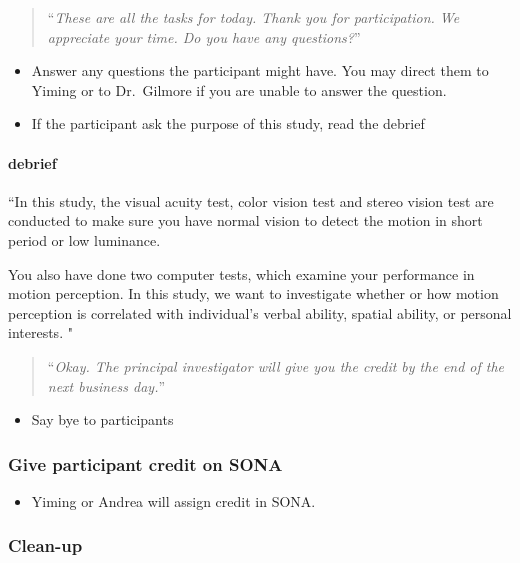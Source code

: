 \documentclass[]{article}
\providecommand{\tightlist}{%
  \setlength{\itemsep}{0pt}\setlength{\parskip}{0pt}}
\let\oldparagraph\paragraph
\renewcommand{\paragraph}[1]{\oldparagraph{#1}\mbox{}}
\begin{document}
\begin{quote}
``\emph{These are all the tasks for today. Thank you for participation.
We appreciate your time. Do you have any questions?}''
\end{quote}

\begin{itemize}
\tightlist
\item
  Answer any questions the participant might have. You may direct them
  to Yiming or to Dr.~Gilmore if you are unable to answer the question.
\item
  If the participant ask the purpose of this study, read the debrief
\end{itemize}

\paragraph{debrief}\label{debrief}

``In this study, the visual acuity test, color vision test and stereo
vision test are conducted to make sure you have normal vision to detect
the motion in short period or low luminance.

You also have done two computer tests, which examine your performance in
motion perception. In this study, we want to investigate whether or how
motion perception is correlated with individual's verbal ability,
spatial ability, or personal interests. "

\begin{quote}
``\emph{Okay. The principal investigator will give you the credit by the
end of the next business day.}''
\end{quote}

\begin{itemize}
\tightlist
\item
  Say bye to participants
\end{itemize}

\subsubsection{Give participant credit on
SONA}\label{give-participant-credit-on-sona}

\begin{itemize}
\tightlist
\item
  Yiming or Andrea will assign credit in SONA.
\end{itemize}

\subsubsection{Clean-up}\label{clean-up}
\end{document}
